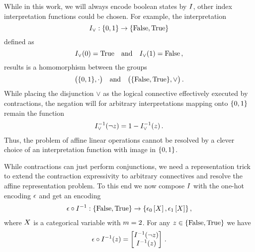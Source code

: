 While in this work, we will always encode boolean states by $I$, other index interpretation functions could be chosen.
For example, the interpretation
	\[ I_{\lor}:\{0,1\}\rightarrow\{\mathrm{False},\mathrm{True}\} \]
defined as
    	\[ I_{\lor}(0) = \mathrm{True} \quad \text{and} \quad I_{\lor}(1) = \mathrm{False} \, , \]
results is a homomorphism between the groups	
	\[ \big(\{0,1\},\cdot\big) \quad \text{and} \quad \big(\{\mathrm{False},\mathrm{True}\},\lor\big)  \, . \]
While placing the disjunction $\lor$ as the logical connective effectively executed by contractions, the negation will for arbitrary interpretations mapping onto $\{0,1\}$ remain the function %
\begin{align*}
 	I_{\lor}^{-1}(\lnot z) = 1 - I_{\lor}^{-1}(z)  \, .
\end{align*}
Thus, the problem of affine linear operations cannot be resolved by a clever choice of an interpretation function with image in $\{0,1\}$. 



While contractions can just perform conjunctions, we need a representation trick to extend the contraction expressivity to arbitrary connectives and resolve the affine representation problem.
To this end we now compose $I$ with the one-hot encoding $\epsilon$ and get an encoding
\begin{align*}
	\epsilon\circ I^{-1} : \{\mathrm{False},\mathrm{True}\} \rightarrow \{\epsilon_0\left[X\right],\epsilon_1\left[X\right]\} \, ,
\end{align*}
where $X$ is a categorical variable with $m=2$.
For any $z\in\{\mathrm{False},\mathrm{True}\}$ we have
\begin{align*}
	\epsilon\circ I^{-1}(z) =
	\begin{bmatrix}
		I^{-1}(\lnot z) \\
		I^{-1}(z)
	\end{bmatrix}  \, .
\end{align*}


